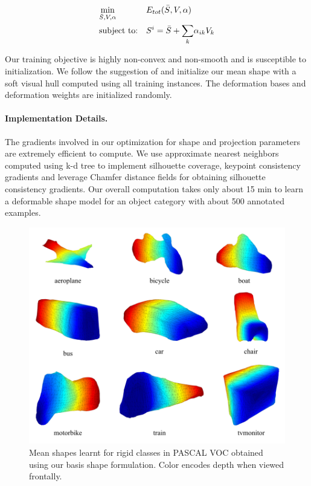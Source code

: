 \begin{equation}
\begin{aligned}
\eqlabel{optimization}
& \underset{\bar{S},V,\alpha}{\text{min}}
& & E_{tot}(\bar{S},V,\alpha) \\
& \text{subject to:}
& & S^i = \bar{S} + \underset{k}{\sum}\alpha_{ik} V_k
\end{aligned}
\end{equation}

Our training objective is highly non-convex and  non-smooth and is susceptible to initialization. We follow the suggestion of \cite{esteban2004snake} and initialize our mean shape with a soft visual hull computed using all training instances. The deformation bases and deformation weights are initialized randomly. 


\paragraph{Implementation Details.}
The gradients involved in our optimization for shape and projection parameters are extremely efficient to compute. We use approximate nearest neighbors computed using k-d tree to implement silhouette coverage,  keypoint consistency gradients and leverage Chamfer distance fields for obtaining silhouette consistency gradients. Our overall computation takes only about 15 min to learn a deformable shape model for an object category with about 500 annotated examples.

\begin{figure}[htb!]
\centering
  \includegraphics[width=\textwidth]{figures/categoryshapes/meanShapesCrop.pdf}
  \caption{Mean shapes learnt for rigid classes in PASCAL VOC obtained using our basis shape formulation. Color encodes depth when viewed frontally.}
  \label{fig:meanDense}
\end{figure}

